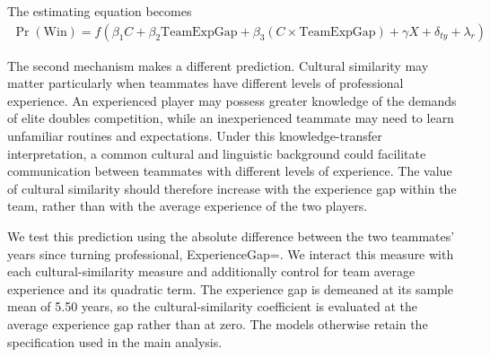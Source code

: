 \documentclass[10pt]{article}
\begin{document}
The estimating equation becomes
\begin{align}
\operatorname{Pr}(\text{Win}) = f(\beta_1 C + \beta_2 \text{TeamExpGap} + \beta_3 (C \times \text{TeamExpGap}) + \gamma X + \delta_{ty} + \lambda_r)
\end{align}




The second mechanism makes a different prediction. Cultural similarity may matter particularly when teammates have different levels of professional experience. An experienced player may possess greater knowledge of the demands of elite doubles competition, while an inexperienced teammate may need to learn unfamiliar routines and expectations. Under this knowledge-transfer interpretation, a common cultural and linguistic background could facilitate communication between teammates with different levels of experience. The value of cultural similarity should therefore increase with the experience gap within the team, rather than with the average experience of the two players.

We test this prediction using the absolute difference between the two teammates' years since turning professional, ExperienceGap=. We interact this measure with each cultural-similarity measure and additionally control for team average experience and its quadratic term. The experience gap is demeaned at its sample mean of 5.50 years, so the cultural-similarity coefficient is evaluated at the average experience gap rather than at zero. The models otherwise retain the specification used in the main analysis.
\end{document}
